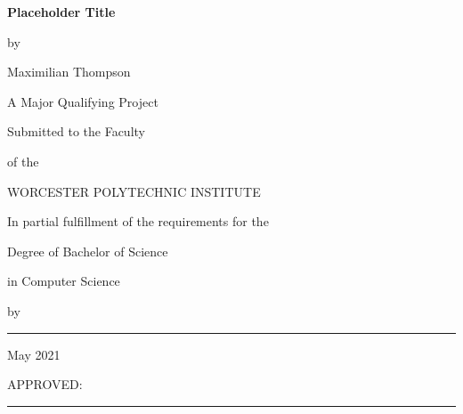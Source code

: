 \documentclass[12pt]{report}
\begin{document}
	
\sloppy

%


%
\newcommand{\brk}{\vspace*{0.18in}}

\thispagestyle{empty}

\begin{center}

\brk


   {\large 
	\textbf{
	 Placeholder Title
	}
   }


\brk
by

\brk
Maximilian Thompson

\brk\brk
A Major Qualifying Project

\brk
Submitted to the Faculty

\brk
of the 

\brk
WORCESTER POLYTECHNIC INSTITUTE
	
\brk
In partial fulfillment of the requirements for the

\brk
Degree of Bachelor of Science

\brk
in Computer Science

\brk


\brk
by

\brk\brk
\rule{3in}{1.2pt}

\brk
May 2021

\end{center}

	
\vfill
APPROVED:

\vspace{0.5in}
\rule{3in}{0.8pt}
\end{document}
